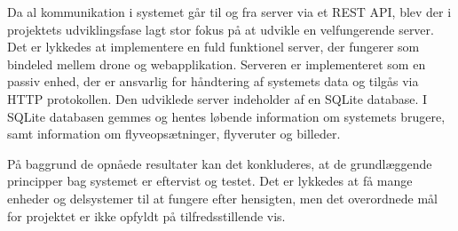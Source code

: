 Da al kommunikation i systemet går til og fra server via et REST API, blev der i projektets udviklingsfase lagt stor fokus på at udvikle en velfungerende server. Det er lykkedes at implementere en fuld funktionel server, der fungerer som bindeled mellem drone og webapplikation. Serveren er implementeret som en passiv enhed, der er ansvarlig for håndtering af systemets data og tilgås via HTTP protokollen. Den udviklede server indeholder af en SQLite database. I SQLite databasen gemmes og hentes løbende information om systemets brugere, samt information om flyveopsætninger, flyveruter og billeder. 


På baggrund de opnåede resultater kan det konkluderes, at de grundlæggende principper bag systemet er eftervist og testet. Det er lykkedes at få  mange enheder og delsystemer til at fungere efter hensigten, men det overordnede mål for projektet er ikke opfyldt på tilfredsstillende vis.
